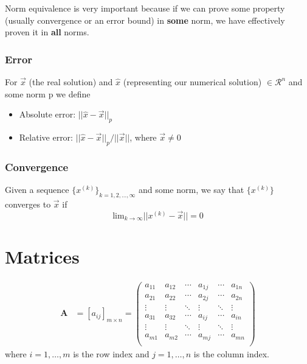 \documentclass[12pt]{article}
\newcommand{\ve}[1]{\ensuremath{\mathbf{#1}}}
\begin{document}
Norm equivalence is very important because if we can prove some property (usually convergence or an error bound) in \textbf{some} norm, we have effectively proven it in \textbf{all} norms. 

\subsubsection{Error}
For $\vec{x}$ (the real solution) and $\hat{x}$ (representing our numerical solution) $\in \mathcal{R}^n$ and some norm p we define
%
\begin{itemize}
\item Absolute error: $||\hat{x} - \vec{x}||_p$
\item Relative error: $||\hat{x} - \vec{x}||_p / ||\vec{x}||$, where $\vec{x} \neq 0$
\end{itemize}

\subsubsection{Convergence}
Given a sequence $\lbrace x^{(k)} \rbrace_{k=1,2,\dots,\infty}$ and some norm, we say that $\lbrace x^{(k)} \rbrace$ converges to $\vec{x}$ if
%
\begin{equation}
\displaystyle\text{lim}_{k \rightarrow \infty} ||x^{(k)} - \vec{x}|| = 0 \nonumber
\end{equation}

\section{Matrices}

\begin{align}
    \ve{A} &= [a_{ij}]_{m\times n}   =    \begin{pmatrix}
      a_{11} & a_{12} & \cdots & a_{1j} & \cdots & a_{1n} \\
      a_{21} & a_{22} & \cdots & a_{2j} & \cdots & a_{2n} \\
       \vdots & \vdots & \ddots & \vdots & \ddots   & \vdots \\     
      a_{31} & a_{32} & \cdots & a_{ij} & \cdots & a_{in} \\
      \vdots & \vdots & \ddots & \vdots & \ddots   & \vdots \\
      a_{m1} & a_{m2} & \cdots & a_{mj} & \cdots & a_{mn} \\
    \end{pmatrix} \nonumber   
\end{align} 
%
where $i = 1, \dots, m$ is the row index and $j = 1, \dots, n$ is the column index.
\end{document}
